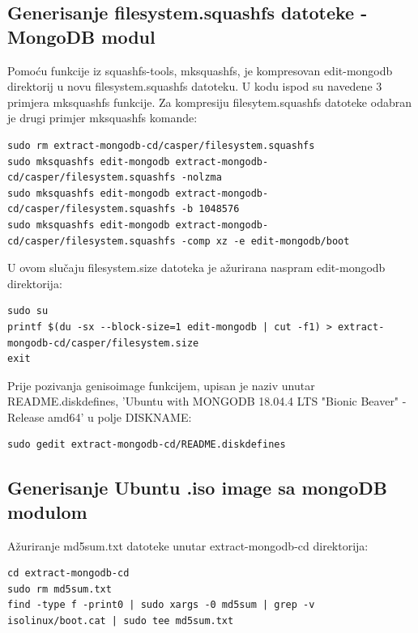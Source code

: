 \documentclass[12pt,vi]{mitthesis}
\begin{document}
\subsection*{Generisanje filesystem.squashfs datoteke - MongoDB modul}
\noindent
Pomoću funkcije iz squashfs-tools, mksquashfs, je kompresovan edit-mongodb direktorij u novu filesystem.squashfs datoteku. U kodu ispod su navedene 3 primjera mksquashfs funkcije. Za kompresiju filesytem.squashfs datoteke odabran je drugi primjer mksquashfs komande:
\begin{lstlisting}[style=BashInputStyle]
sudo rm extract-mongodb-cd/casper/filesystem.squashfs
sudo mksquashfs edit-mongodb extract-mongodb-cd/casper/filesystem.squashfs -nolzma 
sudo mksquashfs edit-mongodb extract-mongodb-cd/casper/filesystem.squashfs -b 1048576
sudo mksquashfs edit-mongodb extract-mongodb-cd/casper/filesystem.squashfs -comp xz -e edit-mongodb/boot
\end{lstlisting}

\noindent
U ovom slučaju filesystem.size datoteka je ažurirana naspram edit-mongodb direktorija:
\begin{lstlisting}[style=BashInputStyle]
sudo su
printf $(du -sx --block-size=1 edit-mongodb | cut -f1) > extract-mongodb-cd/casper/filesystem.size
exit
\end{lstlisting}

\noindent
Prije pozivanja genisoimage funkcijem, upisan je naziv unutar README.diskdefines, 'Ubuntu with MONGODB 18.04.4 LTS "Bionic Beaver" - Release amd64' u polje DISKNAME:
\begin{lstlisting}[style=BashInputStyle]
sudo gedit extract-mongodb-cd/README.diskdefines
\end{lstlisting}

\subsection*{Generisanje Ubuntu .iso image sa mongoDB modulom}
\noindent
Ažuriranje md5sum.txt datoteke unutar extract-mongodb-cd direktorija:
\begin{lstlisting}[style=BashInputStyle]
cd extract-mongodb-cd
sudo rm md5sum.txt
find -type f -print0 | sudo xargs -0 md5sum | grep -v isolinux/boot.cat | sudo tee md5sum.txt
\end{lstlisting}
\end{document}
